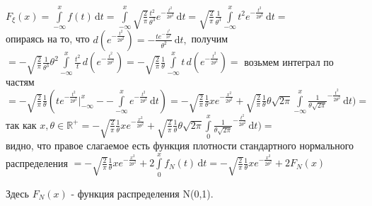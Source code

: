 \documentclass[14pt,a4paper,oneside]{extbook}
\begin{document}
    $F_{\xi}(x) = \int\limits_{-\infty}^{x} f(t) \,\mathrm{d}t = \int\limits_{-\infty}^{x} \displaystyle \sqrt{\frac{2}{\pi}}\frac{t^2}{\theta^3} e^{-\frac{t^2}{2\theta^2}}\,\mathrm{d}t = \displaystyle \sqrt{\frac{2}{\pi}}\frac{1}{\theta^3} \int\limits_{-\infty}^{x} t^2 e^{-\frac{t^2}{2\theta^2}}\,\mathrm{d}t  =$ \\ опираясь на то, что $d(e^{-\frac{t^2}{2\theta^2}})= -\frac{t e^{-\frac{t^2}{2\theta^2}}}{\theta^2}\,\mathrm{d}t,$ получим $= 
    \displaystyle -\sqrt{\frac{2}{\pi}}\frac{1}{\theta^3}\theta^2 \int\limits_{-\infty}^{x} \frac{t^2}{t}\,d(e^{-\frac{t^2}{2\theta^2}}) = \displaystyle -\sqrt{\frac{2}{\pi}}\frac{1}{\theta} \int\limits_{-\infty}^{x}t\,d(e^{-\frac{t^2}{2\theta^2}}) =$ возьмем интеграл по частям $= \displaystyle -\sqrt{\frac{2}{\pi}}\frac{1}{\theta}(t e^{-\frac{t^2}{2\theta^2}}\bigg|_{-\infty}^{x} -- \int\limits_{-\infty}^{x} e^{-\frac{t^2}{2\theta^2}}\,\mathrm{d}t) = \displaystyle -\sqrt{\frac{2}{\pi}}\frac{1}{\theta}x e^{-\frac{x^2}{2\theta^2}} + \sqrt{\frac{2}{\pi}}\frac{1}{\theta}\theta\sqrt{2\pi}\int\limits_{-\infty}^{x} \frac{1}{\theta\sqrt{2\pi}}^{-\frac{t^2}{2\theta^2}}\,\mathrm{d}t) =$\\так как $x,\theta \in \mathbb{R^{+}} =\displaystyle -\sqrt{\frac{2}{\pi}}\frac{1}{\theta}x e^{-\frac{x^2}{2\theta^2}} + \sqrt{\frac{2}{\pi}}\frac{1}{\theta}\theta\sqrt{2\pi}\int\limits_{0}^{x} \frac{1}{\theta\sqrt{2\pi}}^{-\frac{t^2}{2\theta^2}}\,\mathrm{d}t) =$\\ видно, что правое слагаемое есть функция плотности стандартного нормального распределения $= \displaystyle -\sqrt{\frac{2}{\pi}}\frac{1}{\theta}x e^{-\frac{x^2}{2\theta^2}} + 2\int\limits_{0}^{x} f_N(t)\,\mathrm{d}t  =\displaystyle -\sqrt{\frac{2}{\pi}}\frac{1}{\theta}x e^{-\frac{x^2}{2\theta^2}} + 2 F_N(x)$
    
    Здесь $F_N(x)$ - функция распределения N(0,1).\vspace{0.7in}
    
\end{document}

